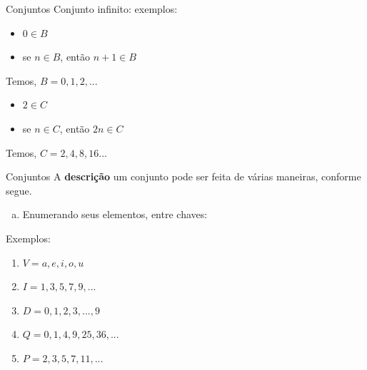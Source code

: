 \documentclass[aspectratio=169]{beamer}
\begin{document}
\begin{frame}{Conjuntos}
    Conjunto infinito: exemplos:

    \begin{itemize}
        \item $0 \in B $
        \item se $n \in B$, então $n + 1 \in B$
    \end{itemize}
    
    \vspace{2mm}
Temos, $B={0,1,2,...}$

\vspace{4mm}
\begin{itemize}
    \item $2 \in C $
    \item se $n \in C$, então $2n \in C$
\end{itemize}

\vspace{2mm}
Temos, $C={2,4,8,16...}$

\end{frame}

\begin{frame}{Conjuntos}
    A \textbf{descrição} um conjunto pode ser feita de várias maneiras, conforme segue.
  
    \begin{enumerate}[a)]
        \item Enumerando seus elementos, entre chaves:
    \end{enumerate}

    \vspace{4mm}

Exemplos:

\begin{enumerate}
    \item $V = { a, e, i, o, u}$
    \item $I = {1, 3, 5, 7, 9, ...}$
    \item $D = {0, 1, 2, 3, ..., 9}$
    \item $Q = {0, 1, 4, 9, 25, 36, ...}$
    \item $P = {2, 3, 5, 7, 11, ...}$
\end{enumerate}

\end{frame}
\end{document}
